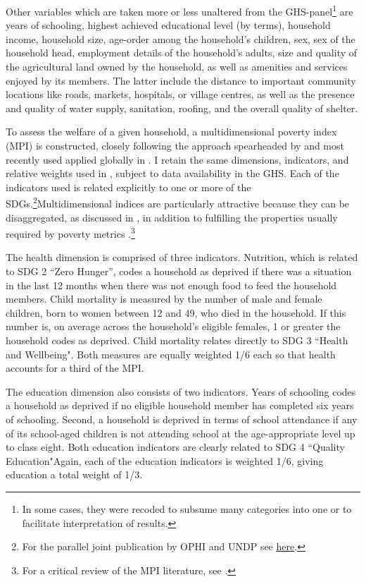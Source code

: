 \documentclass[a4paper,12pt]{article}
\theoremstyle{plain}
\theoremstyle{definition}
\theoremstyle{definition}
\theoremstyle{definition}
\theoremstyle{definition}
\begin{document}
Other variables which are taken more or less unaltered from the GHS-panel\footnote{In some cases, they were recoded to subsume many categories into one or to facilitate interpretation of results.} are years of schooling, highest achieved educational level (by terms), household income, household size, age-order among the household's children, sex, sex of the household head, employment details of the household's adults, size and quality of the agricultural land owned by the household, as well as amenities and services enjoyed by its members. The latter include the distance to important community locations like roads, markets, hospitals, or village centres, as well as the presence and quality of water supply, sanitation, roofing, and the overall quality of shelter.

To assess the welfare of a given household, a multidimensional poverty index (MPI) is constructed, closely following the approach spearheaded by \citet{alkire2011} and most recently used applied globally in \citet{alkire2020}. I retain the same dimensions, indicators, and relative weights used in \citet{alkire2018, alkire2020}, subject to data availability in the GHS. Each of the indicators used is related explicitly to one or more of the SDGs.\footnote{For the parallel joint publication by OPHI and UNDP see \href{http://hdr.undp.org/sites/default/files/2020_mpi_report_en.pdf}{here}. }Multidimensional indices are particularly attractive because they can be disaggregated, as discussed in \citet{bourguignon2003, foster1984}, in addition to fulfilling the properties usually required by poverty metrics \citep[see][]{Sen1976}.\footnote{For a critical review of the MPI literature, see \citet{ravallion2011}.}

The health dimension is comprised of three indicators. Nutrition, which is related to SDG 2 ``Zero Hunger'', codes a household as deprived if there was a situation in the last 12 months when there was not enough food to feed the household members. Child mortality is measured by the number of male and female children, born to women between 12 and 49, who died in the household. If this number is, on average across the household's eligible females, 1 or greater the household codes as deprived. Child mortality relates directly to SDG 3 ``Health and Wellbeing". Both measures are equally weighted 1/6 each so that health accounts for a third of the MPI. 

The education dimension also consists of two indicators. Years of schooling codes a household as deprived if no eligible household member has completed six years of schooling. Second, a household is deprived in terms of school attendance if any of its school-aged children is not attending school at the age-appropriate level up to class eight. Both education indicators are clearly related to SDG 4 ``Quality Education"Again, each of the education indicators is weighted 1/6, giving education a total weight of 1/3.
\end{document}
